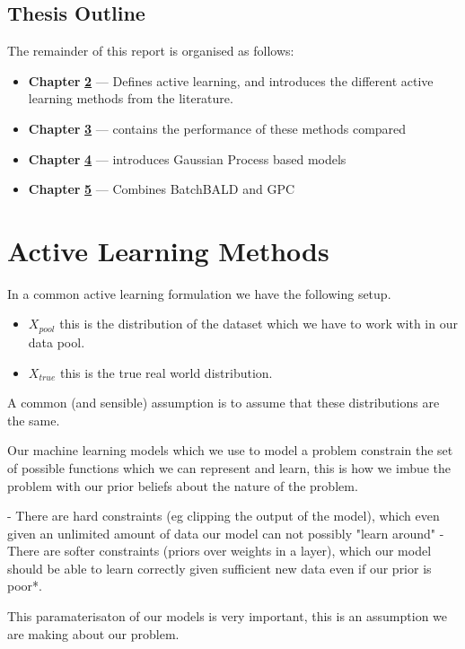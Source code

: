\documentclass[12pt, a4paper]{report}
\begin{document}
\section{Thesis Outline}
The remainder of this report is organised as follows:
\begin{itemize}
    \item[] \textbf{Chapter} \hyperref[Chap2]{\textbf{2}} --- Defines active learning, and introduces the different active learning methods from the literature.
    \item[] \textbf{Chapter} \hyperref[Chap3]{\textbf{3}} --- contains the performance of these methods compared
    \item[] \textbf{Chapter} \hyperref[Chap4]{\textbf{4}} --- introduces Gaussian Process based models
    \item[] \textbf{Chapter} \hyperref[Chap5]{\textbf{5}} --- Combines BatchBALD and GPC
\end{itemize}


\chapter{Active Learning Methods}
\label{Chap2}

In a common active learning formulation we have the following setup.

\begin{itemize}
    \item $X_{pool}$ this is the distribution of the dataset which we have to work with in our data pool.
    \item $X_{true}$ this is the true real world distribution.
\end{itemize}

A common (and sensible) assumption is to assume that these distributions are the same.

Our machine learning models which we use to model a problem constrain the set of possible functions which we can represent and learn, this is how we imbue the problem with our prior beliefs about the nature of the problem.

- There are hard constraints (eg clipping the output of the model), which even given an unlimited amount of data our model can not possibly "learn around"
- There are softer constraints (priors over weights in a layer), which our model should be able to learn correctly given sufficient new data even if our prior is poor*.

This paramaterisaton of our models is very important, this is an assumption we are making about our problem.
\end{document}
